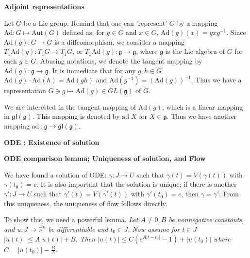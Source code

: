 \documentclass{article}
\newcommand{\ReR}{\mathbb{R}}
\newcommand{\lie}[1]{\mathfrak{#1}}
\newcommand{\Ad}{\textrm{Ad}}
\newcommand{\ad}[1]{\mathrm{ad}\; #1}
\begin{document}
\newpage

\textbf{Adjoint representations}

Let $G$ be a Lie group.
Remind that one can 'represent' $G$ by a mapping $\Ad : G \mapsto \textrm{Aut}(G)$ defined as, for $g \in G$ and $x \in G$, $\Ad(g)(x) = gxg^{-1}$.
Since $\Ad(g) : G \to G$ is a diffeomorphism, we consider a mapping $T_1 \Ad(g) : T_1 G \to T_1 G$, or $T_1 \Ad(g) : \lie{g} \to \lie{g}$, where $\lie{g}$ is the Lie algebra of $G$ for each $g \in G$.
Abusing notations, we denote the tangent mapping by $\Ad(g) : \lie{g} \to \lie{g}$.
It is immediate that for any $g, h \in G$ $\Ad(g) \cdot \Ad(h) = \Ad(gh)$ and $\Ad(g^{-1}) = (\Ad(g))^{-1}$.
Thus we have a representation $G \ni g \mapsto \Ad(g) \in GL(\lie{g})$ of $G$.

We are interested in the tangent mapping of $\Ad(g)$, which is a linear mapping in $\lie{gl}(\lie{g})$.
This mapping is denoted by $\ad{X}$ for $X \in \lie{g}$.
Thus we have another mapping $\ad : \lie{g} \to \lie{gl}(\lie{g})$.

\newpage

\textbf{ODE : Existence of solution}



\newpage

\textbf{ODE comparison lemma; Uniqueness of solution, and Flow}

We have found a solution of ODE: $\gamma : J \to U$ such that $\dot{\gamma}(t) = V(\gamma(t))$ with $\gamma(t_0) = c$.
It is also important that the solution is unique; if there is another $\gamma' : J \to U$ such that $\dot{\gamma'}(t) = V(\gamma'(t))$ with $\gamma'(t_0) = c$, then $\gamma = \gamma'$.
From this uniqueness, the uniqueness of flow follows directly.

To show this, we need a powerful lemma.
\textit{Let $A \ne 0, B$ be nonnegative constants, and $u : J \to \ReR^n$ be differentiable and $t_0 \in J$.}
\textit{Now assume for $t \in J$ $|\dot{u}(t)| \le A |u(t)| + B$.}
\textit{Then $|u(t)| \le C(e^{A|t - t_0|} - 1) + |u(t_0)|$ where $C = |u(t_0)| - \frac{B}{A}$.}
 
\end{document}
